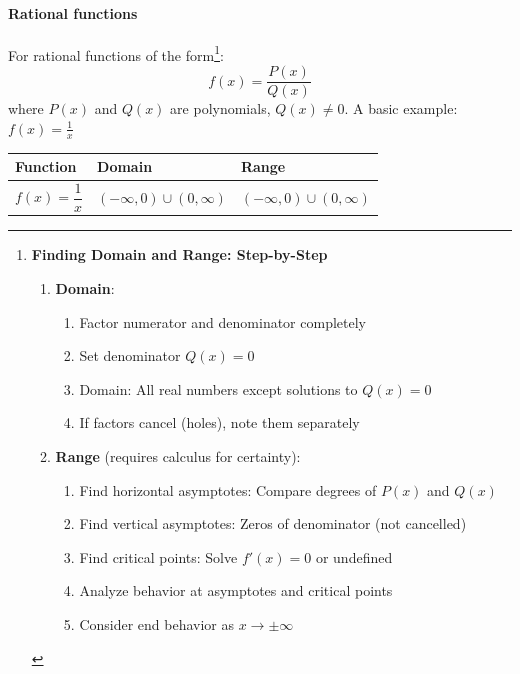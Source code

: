 \documentclass[../main-notes.tex]{subfile}
\begin{document}
\paragraph{Rational functions} For rational functions of the form\footnote{
\textbf{Finding Domain and Range: Step-by-Step}

\begin{enumerate}
    \item \textbf{Domain}:
    \begin{enumerate}
        \item Factor numerator and denominator completely
        \item Set denominator \( Q(x) = 0 \)
        \item Domain: All real numbers except solutions to \( Q(x) = 0 \)
        \item If factors cancel (holes), note them separately
    \end{enumerate}
    
    \item \textbf{Range} (requires calculus for certainty):
    \begin{enumerate}
        \item Find horizontal asymptotes: Compare degrees of \( P(x) \) and \( Q(x) \)
        \item Find vertical asymptotes: Zeros of denominator (not cancelled)
        \item Find critical points: Solve \( f'(x) = 0 \) or undefined
        \item Analyze behavior at asymptotes and critical points
        \item Consider end behavior as \( x \to \pm\infty \)
    \end{enumerate}
\end{enumerate}
}:
\[
f(x) = \frac{P(x)}{Q(x)}
\]
where \( P(x) \) and \( Q(x) \) are polynomials, \( Q(x) \neq 0 \).
A basic example: \( f(x) = \frac{1}{x} \)


\begin{table}[h]
\centering
\renewcommand{\arraystretch}{1.5}
\begin{tabular}{@{}lll@{}}
\toprule
\textbf{Function} & \textbf{Domain} & \textbf{Range} \\ 
\midrule
\( f(x) = \dfrac{1}{x} \) & \( (-\infty, 0) \cup (0, \infty) \) & \( (-\infty, 0) \cup (0, \infty) \) \\
\bottomrule
\end{tabular}
\end{table}
\end{document}
